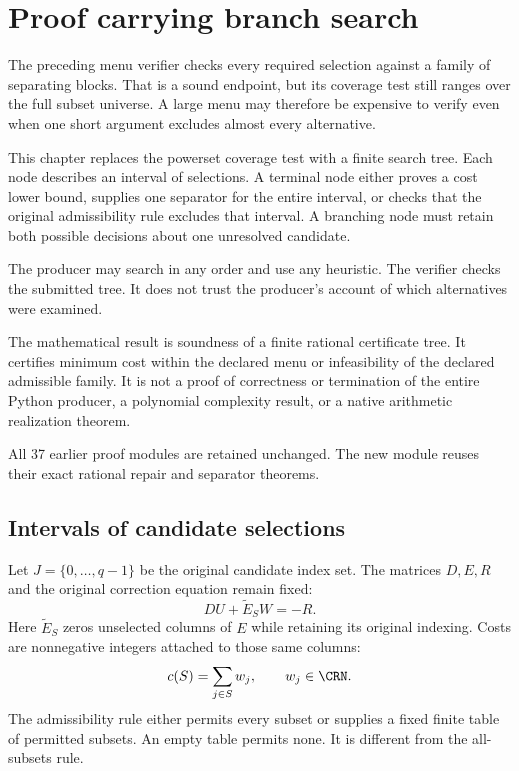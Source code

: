 \section{Proof carrying branch search}\label{CR:cr-source-section-11}
\label{CR:ch:branch-search}

The preceding menu verifier checks every required selection against a family of separating blocks. That is a sound endpoint, but its coverage test still ranges over the full subset universe. A large menu may therefore be expensive to verify even when one short argument excludes almost every alternative.

This chapter replaces the powerset coverage test with a finite search tree. Each node describes an interval of selections. A terminal node either proves a cost lower bound, supplies one separator for the entire interval, or checks that the original admissibility rule excludes that interval. A branching node must retain both possible decisions about one unresolved candidate.

The producer may search in any order and use any heuristic. The verifier checks the submitted tree. It does not trust the producer's account of which alternatives were examined.

\begin{scopebox}[title=The new verified boundary]
The mathematical result is soundness of a finite rational certificate tree. It certifies minimum cost within the declared menu or infeasibility of the declared admissible family. It is not a proof of correctness or termination of the entire Python producer, a polynomial complexity result, or a native arithmetic realization theorem.

All 37 earlier proof modules are retained unchanged. The new module reuses their exact rational repair and separator theorems.
\end{scopebox}

\subsection{Intervals of candidate selections}

Let $J=\{0,\ldots,q-1\}$ be the original candidate index set. The matrices $D,E,R$ and the original correction equation remain fixed:
\[
 DU+\widetilde E_S W=-R.
\]
Here $\widetilde E_S$ zeros unselected columns of $E$ while retaining its original indexing. Costs are nonnegative integers attached to those same columns:
\[
 c(S)=\sum_{j\in S}w_j,\qquad w_j\in\CRN.
\]
The admissibility rule either permits every subset or supplies a fixed finite table of permitted subsets. An empty table permits none. It is different from the all-subsets rule.

